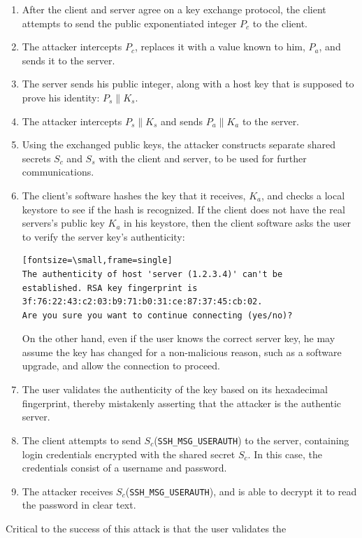 \begin{enumerate}
  \item After the client and server agree on a key exchange protocol,
    the client attempts to send the public exponentiated integer $P_c$
    to the client.
  \item The attacker intercepts $P_c$, replaces it with a value
    known to him, $P_a$, and sends it to the server.
  \item The server sends his public integer, along with a host key
  that is supposed to prove his identity: $P_s \parallel K_s$.
  \item The attacker intercepts $P_s \parallel K_s$ and sends $P_a
  \parallel K_a$ to the server.
  \item Using the exchanged public keys, the attacker constructs
    separate shared secrets $S_c$ and $S_s$ with the client and
    server, to be used for further communications.
  \item The client's software hashes the key that it receives, $K_a$,
    and checks a local keystore to see if the hash is recognized. If
    the client does not have the real servers's public key $K_a$ in his
    keystore, then the client software asks the user to verify the
    server key's authenticity:
    \begin{verbatim}[fontsize=\small,frame=single]
The authenticity of host 'server (1.2.3.4)' can't be 
established. RSA key fingerprint is 
3f:76:22:43:c2:03:b9:71:b0:31:ce:87:37:45:cb:02.
Are you sure you want to continue connecting (yes/no)?
    \end{verbatim}
  On the other hand, even if the user knows the correct server key,
  he may assume the key has changed for a non-malicious reason,
  such as a software upgrade, and allow the connection to proceed.
  \item The user validates the authenticity of the key based on its
    hexadecimal fingerprint, thereby mistakenly asserting that the
    attacker is the authentic server.
  \item The client attempts to send $S_c$(\texttt{SSH\_MSG\_USERAUTH})
    to the server, containing login credentials encrypted with the
    shared secret $S_c$. In this case, the credentials consist of a
    username and password.
  \item The attacker receives $S_c$(\texttt{SSH\_MSG\_USERAUTH}), and
    is able to decrypt it to read the password in clear text.
\end{enumerate}
Critical to the success of this attack is that the user validates the
